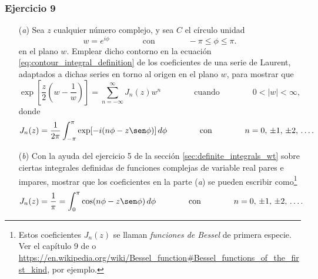 \documentclass[a4paper]{report}
\begin{document}
\subsubsection*{Ejercicio 9}
\begin{enumerate}
 \item[(\textit{a})] Sea \(z\) cualquier número complejo, y sea \(C\) el círculo unidad
 \[
  w=e^{i\phi}
  \qquad\qquad\textrm{con}\qquad\qquad
  -\pi\leq\phi\leq\pi.
 \]
 en el plano \(w\). Emplear dicho contorno en la ecuación \ref{eq:contour_integral_definition} de los coeficientes de una serie de Laurent, adaptados a dichas series en torno al origen en el plano \(w\), para mostrar que 
 \[
  \exp\left[\frac{z}{2}\left(w-\frac{1}{w}\right)\right]=\sum_{n=-\infty}^\infty J_n(z)w^n
  \qquad\qquad\textrm{cuando}\qquad\qquad
  0<|w|<\infty,
 \]
 donde
 \[
  J_n(z)=\frac{1}{2\pi}\int_{-\pi}^\pi\exp[-i(n\phi-z\sen\phi)]\,d\phi
  \qquad\qquad\textrm{con}\qquad\qquad
  n=0,\,\pm1,\,\pm2,\,\dots.
 \]
 \item[(\textit{b})] Con la ayuda del ejercicio 5 de la sección \ref{sec:definite_integrals_wt} sobre ciertas integrales definidas de funciones complejas de variable real pares e impares, mostrar que los coeficientes en la parte (\textit{a}) se pueden escribir como\footnote{Estos coeficientes \(J_n(z)\) se llaman \emph{funciones de Bessel} de primera especie. Ver el capítulo 9 de \cite{brown2012fourier} o \url{https://en.wikipedia.org/wiki/Bessel_function\#Bessel_functions_of_the_first_kind}, por ejemplo.} 
 \[
  J_n(z)=\frac{1}{\pi}=\int_0^\pi\cos(n\phi-z\sen\phi)\,d\phi
  \qquad\qquad\textrm{con}\qquad\qquad
  n=0,\,\pm1,\,\pm2,\,\dots.
 \]
\end{enumerate}
\end{document}
